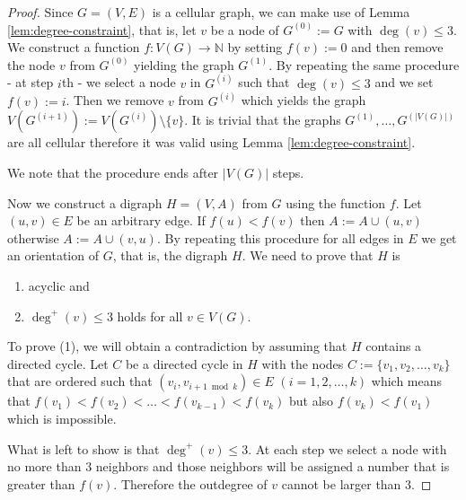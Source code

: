 \documentclass[a4paper, 12pt]{article}
\begin{document}
\begin{proof} Since $G=(V,E)$ is a cellular graph, we can make use of Lemma \ref{lem:degree-constraint}, that is, let $v$ be a node of $G^{(0)}:=G$ with $\deg(v) \leqslant 3$. We construct a function $f\colon V(G) \to \mathbb{N}$ by setting $f(v) := 0$ and then remove the node $v$ from $G^{(0)}$ yielding the graph $G^{(1)}$. By repeating the same procedure - at step $i$th - we select a node $v$ in $G^{(i)}$ such that $\deg(v) \leqslant 3$ and we set $f(v):=i$. Then we remove $v$ from $G^{(i)}$ which yields the graph $V(G^{(i+1)}) := V(G^{(i)}) \setminus \lbrace v \rbrace$. It is trivial that the graphs $G^{(1)},\ldots,G^{(|V(G)|)}$ are all cellular therefore it was valid using Lemma \ref{lem:degree-constraint}.

We note that the procedure ends after $|V(G)|$ steps.

Now we construct a digraph $H=(V,A)$ from $G$ using the function $f$. Let $(u,v) \in E$ be an arbitrary edge. If $f(u) < f(v)$ then $A:=A\cup (u,v)$ otherwise $A:=A \cup (v,u)$. By repeating this procedure for all edges in $E$ we get an orientation of $G$, that is, the digraph $H$. We need to prove that $H$ is
\begin{enumerate}
\item acyclic and
\item $\deg^+(v) \leqslant 3$ holds for all $v \in V(G)$.
\end{enumerate}
To prove (1), we will obtain a contradiction by assuming that $H$ contains a directed cycle. Let $C$ be a directed cycle in $H$ with the nodes $C:=\lbrace v_1,v_2,\ldots,v_k \rbrace$ that are ordered such that $(v_i,v_{i+1 \bmod{k}}) \in E$ $(i=1,2,\ldots,k)$ which means that $f(v_1) < f(v_2) < \ldots < f(v_{k-1}) < f(v_k)$ but also $f(v_k) < f(v_1)$ which is impossible.

What is left to show is that $\deg^+(v) \leqslant 3$. At each step we select a node with no more than $3$ neighbors and those neighbors will be assigned a number that is greater than $f(v)$. Therefore the outdegree of $v$ cannot be larger than $3$.
\end{proof}
\end{document}
